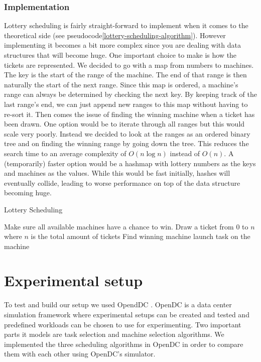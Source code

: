 \documentclass{article}
\begin{document}
\subsubsection{Implementation}
Lottery scheduling is fairly straight-forward to implement when it comes to the theoretical side (see pseudocode\ref{lottery-scheduling-algorithm}). However implementing it becomes a bit more complex since you are dealing with data structures that will become huge. One important choice to make is how the tickets are represented. We decided to go with a map from numbers to machines. The key is the start of the range of the machine. The end of that range is then naturally the start of the next range. Since this map is ordered, a machine's range can always be determined by checking the next key. By keeping track of the last range's end, we can just append new ranges to this map without having to re-sort it. Then comes the issue of finding the winning machine when a ticket has been drawn. One option would be to iterate through all ranges but this would scale very poorly. Instead we decided to look at the ranges as an ordered binary tree and on finding the winning range by going down the tree. This reduces the search time to an average complexity of $O(n\log{}n)$ instead of $O(n)$. A (temporarily) faster option would be a hashmap with lottery numbers as the keys and machines as the values. While this would be fast initially, hashes will eventually collide, leading to worse performance on top of the data structure becoming huge.

\begin{algorithm}
\caption{Lottery Scheduling}\label{lottery-scheduling-algorithm}
\begin{algorithmic}[1]
\State Make sure all available machines have a chance to win.
\Do
\State Draw a ticket from 0 to $n$ where $n$ is the total amount of tickets
\State Find winning machine
\State launch task on the machine
\end{algorithmic}
\end{algorithm}

\section{Experimental setup}\label{experiments}
To test and build our setup we used OpendDC \cite{OpenDC}. OpenDC is a data center simulation framework where experimental setups can be created and tested and predefined workloads can be chosen to use for experimenting. Two important parts it models are task selection and machine selection algorithms. We implemented the three scheduling algorithms in OpenDC in order to compare them with each other using OpenDC's simulator.
\end{document}
